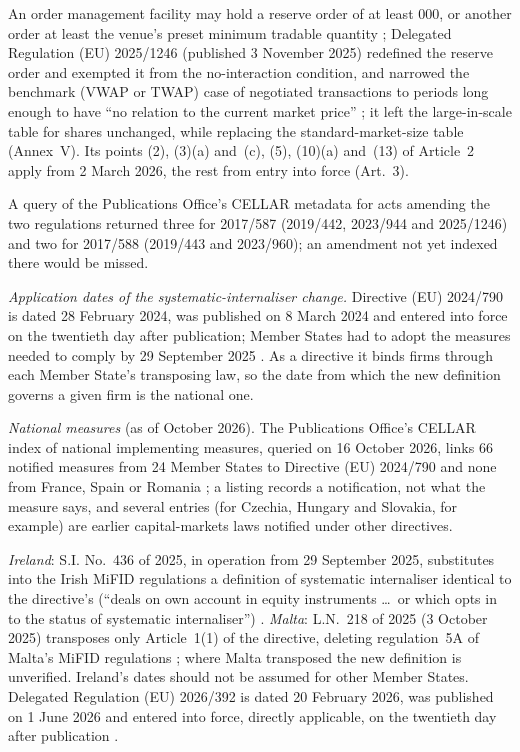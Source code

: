 \begin{qfrule}
An order management facility may hold a reserve order of at least 000, or another order at least the venue's preset minimum tradable quantity \citep[Art.~8(2)]{eu-rts1-2017-587}; Delegated Regulation (EU) 2025/1246 (published 3 November 2025) redefined the reserve order and exempted it from the no-interaction condition, and narrowed the benchmark (VWAP or TWAP) case of negotiated transactions to periods long enough to have ``no relation to the current market price'' \citep[Art.~2(4) and~(6)]{eu-rts1-amend-2025-1246}; it left the large-in-scale table for shares unchanged, while replacing the standard-market-size table (Annex~V). Its points (2), (3)(a) and~(c), (5), (10)(a) and~(13) of Article~2 apply from 2 March 2026, the rest from entry into force (Art.~3).

A query of the Publications Office's CELLAR metadata for acts amending the two regulations returned three for 2017/587 (2019/442, 2023/944 and 2025/1246) and two for 2017/588 (2019/443 and 2023/960); an amendment not yet indexed there would be missed.

 \emph{Application dates of the systematic-internaliser change.} Directive (EU) 2024/790 is dated 28 February 2024, was published on 8 March 2024 and entered into force on the twentieth day after publication; Member States had to adopt the measures needed to comply by 29 September 2025 \citep[Arts.~2(1) and~3]{eu-dir-2024-790}. As a directive it binds firms through each Member State's transposing law, so the date from which the new definition governs a given firm is the national one.

\emph{National measures} (as of October 2026). The Publications Office's CELLAR index of national implementing measures, queried on 16 October 2026, links 66 notified measures from 24 Member States to Directive (EU) 2024/790 and none from France, Spain or Romania \citep[query of national implementing measures]{eu-nim-2024-790}; a listing records a notification, not what the measure says, and several entries (for Czechia, Hungary and Slovakia, for example) are earlier capital-markets laws notified under other directives.

\emph{Ireland}: S.I. No.~436 of 2025, in operation from 29 September 2025, substitutes into the Irish MiFID regulations a definition of systematic internaliser identical to the directive's (``deals on own account in equity instruments \dots\ or which opts in to the status of systematic internaliser'') \citep[regs~1 and~4(c)]{ie-si-436-2025}. \emph{Malta}: L.N.~218 of 2025 (3 October 2025) transposes only Article~1(1) of the directive, deleting regulation~5A of Malta's MiFID regulations \citep[regs~1(2) and~2]{mt-ln-218-2025}; where Malta transposed the new definition is unverified. Ireland's dates should not be assumed for other Member States. Delegated Regulation (EU) 2026/392 is dated 20 February 2026, was published on 1 June 2026 and entered into force, directly applicable, on the twentieth day after publication \citep[Art.~2]{eu-reg-del-2026-392}.


\end{qfrule}

